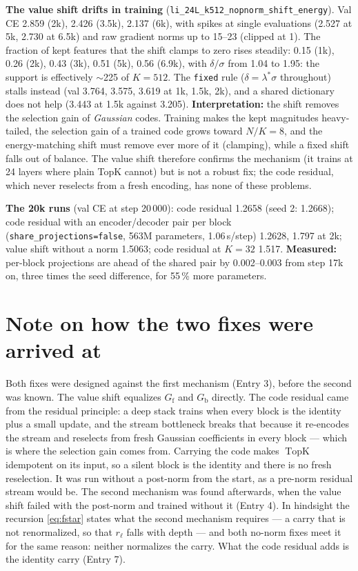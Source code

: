 \documentclass[11pt,a4paper]{article}
\newcommand{\code}[1]{\texttt{#1}}
\newcommand{\Gf}{G_{\mathrm{f}}}
\newcommand{\Gb}{G_{\mathrm{b}}}
\newcommand{\topk}{\operatorname{TopK}}
\begin{document}
\textbf{The value shift drifts in training} (\code{li\_24L\_k512\_nopnorm\_shift\_energy}).  Val CE
2.859 (2k), 2.426 (3.5k), 2.137 (6k), with spikes at single evaluations (2.527 at 5k, 2.730 at 6.5k) and
raw gradient norms up to 15--23 (clipped at 1).  The fraction of kept features that the shift clamps to
zero rises steadily: 0.15 (1k), 0.26 (2k), 0.43 (3k), 0.51 (5k), 0.56 (6.9k), with \(\delta/\sigma\) from
1.04 to 1.95: the support is effectively \(\sim\)225 of \(K=512\).  The \code{fixed} rule
(\(\delta=\lambda^\ast\sigma\) throughout) stalls instead (val 3.764, 3.575, 3.619 at 1k, 1.5k, 2k), and a
shared dictionary does not help (3.443 at 1.5k against 3.205).
\textbf{Interpretation:} the shift removes the selection gain of \emph{Gaussian} codes.  Training makes the
kept magnitudes heavy-tailed, the selection gain of a trained code grows toward \(N/K=8\), and the
energy-matching shift must remove ever more of it (clamping), while a fixed shift falls out of balance.
The value shift therefore confirms the mechanism (it trains at 24 layers where plain TopK cannot) but
is not a robust fix; the code residual, which never reselects from a fresh encoding, has none of these
problems.

\textbf{The 20k runs} (val CE at step 20\,000): code residual 1.2658 (seed 2: 1.2668); code residual with an
encoder/decoder pair per block (\code{share\_projections=false}, 563M parameters, 1.06\,s/step) 1.2628, 1.797 at
2k; value shift without a norm 1.5063; code residual at \(K=32\) 1.517.  \textbf{Measured:} per-block projections
are ahead of the shared pair by 0.002--0.003 from step 17k on, three times the seed difference, for 55\,\% more
parameters.

\section{Note on how the two fixes were arrived at}

Both fixes were designed against the first mechanism (Entry 3), before the second was known.  The value shift
equalizes \(\Gf\) and \(\Gb\) directly.  The code residual came from the residual principle: a deep stack trains
when every block is the identity plus a small update, and the stream bottleneck breaks that because it re-encodes
the stream and reselects from fresh Gaussian coefficients in every block --- which is where the selection gain
comes from.  Carrying the code makes \(\topk\) idempotent on its input, so a silent block is the identity and there
is no fresh reselection.  It was run without a post-norm from the start, as a pre-norm residual stream would be.
The second mechanism was found afterwards, when the value shift failed with the post-norm and trained without
it (Entry 4).  In hindsight the recursion \eqref{eq:fstar} states what the second mechanism requires --- a carry
that is not renormalized, so that \(r_\ell\) falls with depth --- and both no-norm fixes meet it for the same
reason: neither normalizes the carry.  What the code residual adds is the identity carry (Entry 7).
\end{document}
